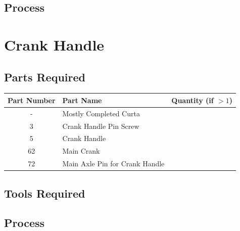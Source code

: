 \documentclass{article}
\begin{document}
\subsection{Process}


\newpage
\section{Crank Handle}
\subsection{Parts Required}
\begin{table}[h!]
	\centering
	\begin{tabular}{clc}
		Part Number & Part Name & Quantity (if $>1$) \\ \hline
		- & Mostly Completed Curta & \\
		3 & Crank Handle Pin Screw & \\
		5 & Crank Handle & \\
		62 & Main Crank & \\
		72 & Main Axle Pin for Crank Handle
	\end{tabular}
\end{table}

\subsection{Tools Required}

\subsection{Process}
\end{document}
